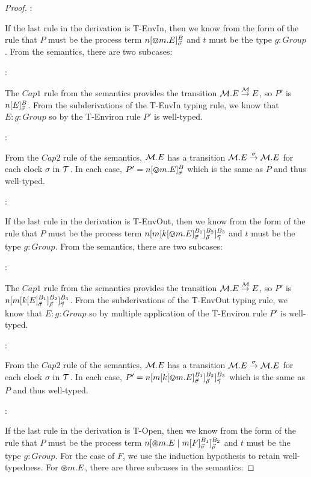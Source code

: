 \begin{proof}
:

\noindent If the last rule in the derivation is T-EnvIn, then we know
from the form of the rule that $P$ must be the process term
${n}[ \varovee m.E ]^{B}_{\vec{\sigma}}$ and $t$ must be the type $g :
  Group$.  From the semantics, there are two subcases:

:

\noindent The $Cap1$ rule from the semantics provides the transition
$\text{$\mathcal{M}$}.E \stackrel{\text{$\mathcal{M}$}}{\rightarrow} E$, so $P'$ is
${n}[ E ]^{B}_{\vec{\sigma}}$.  From the subderivations of the
T-EnvIn typing rule, we know that $E : g : Group$ so by the T-Environ
rule $P'$ is well-typed.

:

\noindent From the $Cap2$ rule of the semantics, $\text{$\mathcal{M}$}.E$ has a
transition $\text{$\mathcal{M}$}.E \stackrel{\sigma}{\rightarrow} \text{$\mathcal{M}$}.E$ for each clock
$\sigma$ in $\text{$\mathcal{T}$}$.  In each case, $P' =
{n}[ \varovee m.E ]^{B}_{\vec{\sigma}}$ which is the same as $P$ and
thus well-typed.

:

\noindent If the last rule in the derivation is T-EnvOut, then we know
from the form of the rule that $P$ must be the process term
${n}[ {m}[ {k}[ \varovee m.E ]^{B_1}_{\vec{\sigma}} ]^{B_2}_{\vec{\rho}} ]^{B_3}_{\vec{\gamma}}$
and $t$ must be the type $g : Group$.  From the semantics, there are
two subcases:

:

\noindent The $Cap1$ rule from the semantics provides the transition
$\text{$\mathcal{M}$}.E \stackrel{\text{$\mathcal{M}$}}{\rightarrow} E$, so $P'$ is \linebreak
${n}[ {m}[ {k}[ E ]^{B_1}_{\vec{\sigma}} ]^{B_2}_{\vec{\rho}} ]^{B_3}_{\vec{\gamma}}$.
From the subderivations of the T-EnvOut typing rule, we know that $E : g
: Group$ so by multiple application of the T-Environ rule $P'$ is
well-typed.

:

\noindent From the $Cap2$ rule of the semantics, $\text{$\mathcal{M}$}.E$ has a
transition $\text{$\mathcal{M}$}.E \stackrel{\sigma}{\rightarrow} \text{$\mathcal{M}$}.E$ for each clock
$\sigma$ in $\text{$\mathcal{T}$}$.  In each case, $P' =
{n}[ {m}[ {k}[ \varovee m.E ]^{B_1}_{\vec{\sigma}} ]^{B_2}_{\vec{\rho}} ]^{B_3}_{\vec{\gamma}}$
which is the same as $P$ and thus well-typed.

:

\noindent If the last rule in the derivation is T-Open, then we know
from the form of the rule that $P$ must be the process term
${n}[ \varoast m.E \;|\;
  {m}[ F ]^{B_1}_{\vec{\sigma}} ]^{B_2}_{\vec{\rho}}$ and $t$ must be
the type $g : Group$.  For the case of $F$, we use the induction
hypothesis to retain well-typedness.  For $\varoast m.E$, there are
three subcases in the semantics:


\end{proof}
